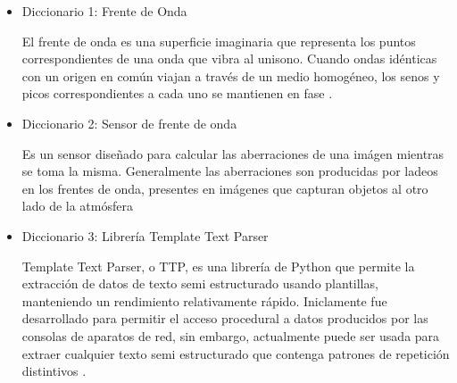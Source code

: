\begin{itemize}
    \item Diccionario 1: Frente de Onda

    El frente de onda es una superficie imaginaria que representa los puntos correspondientes de una onda que vibra al unisono. Cuando ondas idénticas con un origen en común viajan a través de un medio homogéneo, los senos y picos correspondientes a cada uno se mantienen en fase \cite{britannica2022front}. 

    \item Diccionario 2: Sensor de frente de onda

    Es un sensor diseñado para calcular las aberraciones de una imágen mientras se toma la misma. Generalmente las aberraciones son producidas por ladeos en los frentes de onda, presentes en imágenes que capturan objetos al otro lado de la atmósfera \cite{platt2001sh}

     \item Diccionario 3: Librería Template Text Parser

     Template Text Parser, o TTP, es una librería de Python que permite la extracción de datos de texto semi estructurado usando plantillas, manteniendo un rendimiento relativamente rápido. Iniclamente fue desarrollado para permitir el acceso procedural a datos producidos por las consolas de aparatos de red, sin embargo, actualmente puede ser usada para extraer cualquier texto semi estructurado que contenga patrones de repetición distintivos \cite{dmulyalin2021ttp}.
\end{itemize}